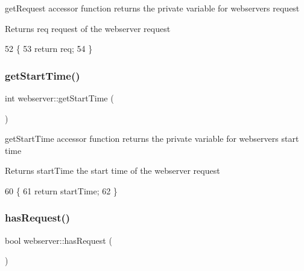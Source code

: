 get\+Request accessor function returns the private variable for webserver\textquotesingle{}s request \begin{DoxyReturn}{Returns}
req request of the webserver request 
\end{DoxyReturn}

\begin{DoxyCode}
52                              \{
53             \textcolor{keywordflow}{return} req;
54         \}
\end{DoxyCode}
\mbox{\label{classwebserver_abaf7c05ca6d47a7800cfbcde62fa1744}} 
\subsubsection{\texorpdfstring{get\+Start\+Time()}{getStartTime()}}
{\footnotesize\ttfamily int webserver\+::get\+Start\+Time (\begin{DoxyParamCaption}{ }\end{DoxyParamCaption})\hspace{0.3cm}{\ttfamily [inline]}}

get\+Start\+Time accessor function returns the private variable for webserver\textquotesingle{}s start time \begin{DoxyReturn}{Returns}
start\+Time the start time of the webserver request 
\end{DoxyReturn}

\begin{DoxyCode}
60                            \{
61             \textcolor{keywordflow}{return} startTime;
62         \}
\end{DoxyCode}
\mbox{\label{classwebserver_a766a603b21e0b4872fe28c3e747d104b}} 
\subsubsection{\texorpdfstring{has\+Request()}{hasRequest()}}
{\footnotesize\ttfamily bool webserver\+::has\+Request (\begin{DoxyParamCaption}{ }\end{DoxyParamCaption})\hspace{0.3cm}{\ttfamily [inline]}}

